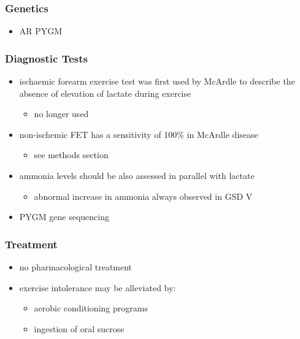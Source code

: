 \documentclass{scrartcl}
\begin{document}
\subsubsection{Genetics}
\label{sec:org033cd23}
\begin{itemize}
\item AR PYGM
\end{itemize}

\subsubsection{Diagnostic Tests}
\label{sec:orgd6b6198}
\begin{itemize}
\item ischaemic forearm exercise test was first used by McArdle to
describe the absence of elevation of lactate during exercise
\begin{itemize}
\item no longer used
\end{itemize}
\item non-ischemic FET has a sensitivity of 100\% in McArdle disease
\begin{itemize}
\item see methods section
\end{itemize}
\item ammonia levels should be also assessed in parallel with lactate
\begin{itemize}
\item abnormal increase in ammonia always observed in GSD V
\end{itemize}
\item PYGM gene sequencing
\end{itemize}

\subsubsection{Treatment}
\label{sec:orgc883f30}
\begin{itemize}
\item no pharmacological treatment
\item exercise intolerance may be alleviated by:
\begin{itemize}
\item aerobic conditioning programs
\item ingestion of oral sucrose
\end{itemize}
\end{itemize}
\end{document}
